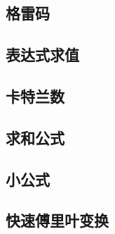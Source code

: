 \subsection{格雷码}


\subsection{表达式求值}


\subsection{卡特兰数}


\subsection{求和公式}


\subsection{小公式}


\subsection{快速傅里叶变换}


